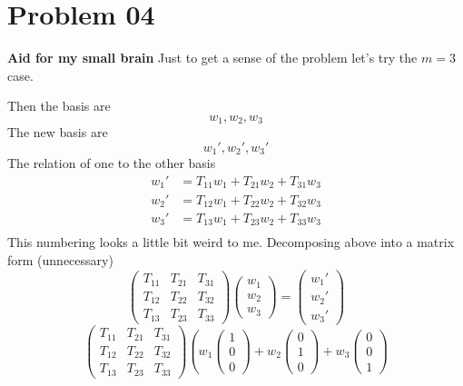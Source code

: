 \documentclass[letter]{article}
\begin{document}
\section*{Problem 04} 
\begin{tcolorbox}[colback=white,colframe=NordBlue,sharpish corners]
	\textbf{Aid for my small brain}\hspace{0.5cm}
	Just to get a sense of the problem let's try the $m = 3$ case.

	Then the basis are
	\[
	w_1, w_2, w_3
	\] 
	The new basis are 
	\[
	w_1', w_2', w_3'
	\] 
	The relation of one to the other basis 
	\begin{align*}
		w_1' &= T_{11} w_1 + T_{21} w_2 + T_{31} w_3 \\
		w_2' &= T_{12}w_1 + T_{22}w_2 + T_{32} w_3 \\
		w_3' &= T_{13}w_1 + T_{23}w_2 + T_{33}w_3 \\
	\end{align*}
	This numbering looks a little bit weird to me. Decomposing above into a matrix form (unnecessary)
	\[
		\begin{pmatrix} T_{11} & T_{21} & T_{31} \\ 
		T_{12} & T_{22} & T_{32} \\ 
	T_{13} & T_{23} & T_{33} \end{pmatrix} 
	\begin{pmatrix} w_1 \\ w_2 \\ w_3 \end{pmatrix} = 
	\begin{pmatrix} w_1' \\ w_2' \\ w_3' \end{pmatrix} 
	\] 
	\[
		\begin{pmatrix} T_{11} & T_{21} & T_{31} \\ 
		T_{12} & T_{22} & T_{32} \\ 
	T_{13} & T_{23} & T_{33} \end{pmatrix}  
	\left(
	w_1 \begin{pmatrix} 1 \\ 0 \\ 0 \end{pmatrix}  + 
	w_2 \begin{pmatrix} 0 \\ 1 \\ 0 \end{pmatrix} + 
	w_3 \begin{pmatrix} 0 \\ 0 \\ 1 \end{pmatrix} 
\]
\end{tcolorbox}
\end{document}

